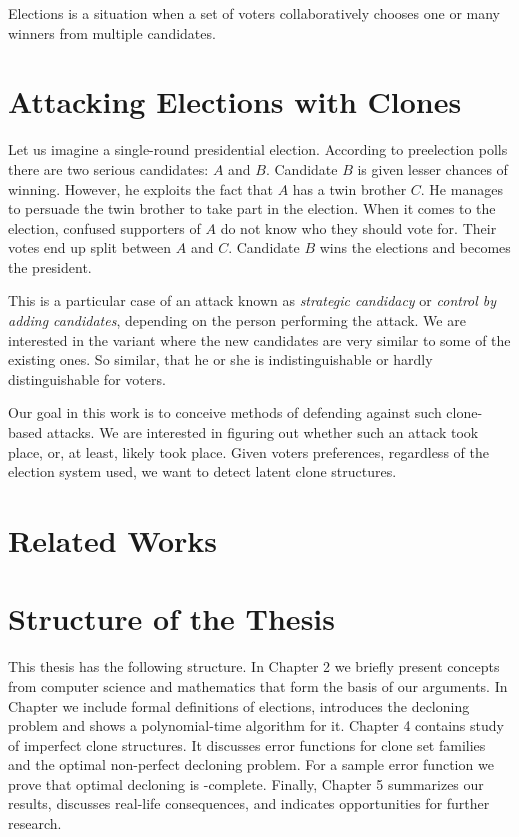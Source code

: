 Elections is a situation when a set of voters collaboratively chooses one or many winners from multiple candidates.

\section{Attacking Elections with Clones}

Let us imagine a single-round presidential election.
According to preelection polls there are two serious candidates: $A$ and $B$.
Candidate $B$ is given lesser chances of winning.
However, he exploits the fact that $A$ has a twin brother $C$.
He manages to persuade the twin brother to take part in the election.
When it comes to the election, confused supporters of $A$ do not know who they should vote for.
Their votes end up split between $A$ and $C$.
Candidate $B$ wins the elections and becomes the president.

This is a particular case of an attack known as \textit{strategic candidacy} or \textit{control by adding candidates},
depending on the person performing the attack.
We are interested in the variant where the new candidates are very similar to some of the existing ones.
So similar, that he or she is indistinguishable or hardly distinguishable for voters.

Our goal in this work is to conceive methods of defending against such clone-based attacks.
We are interested in figuring out whether such an attack took place, or, at least, likely took place.
Given voters preferences, regardless of the election system used, we want to detect latent clone structures.

\section{Related Works}


\section{Structure of the Thesis}


This thesis has the following structure.
In Chapter 2 we briefly present concepts from computer science
and mathematics that form the basis of our arguments.
In Chapter we include formal definitions of elections, introduces the decloning problem
and shows a polynomial-time algorithm for it.
Chapter 4 contains study of imperfect clone structures.
It discusses error functions for clone set families and the optimal non-perfect decloning problem.
For a sample error function we prove that optimal decloning is \np-complete.
Finally, Chapter 5 summarizes our results, discusses real-life consequences,
and indicates opportunities for further research.
